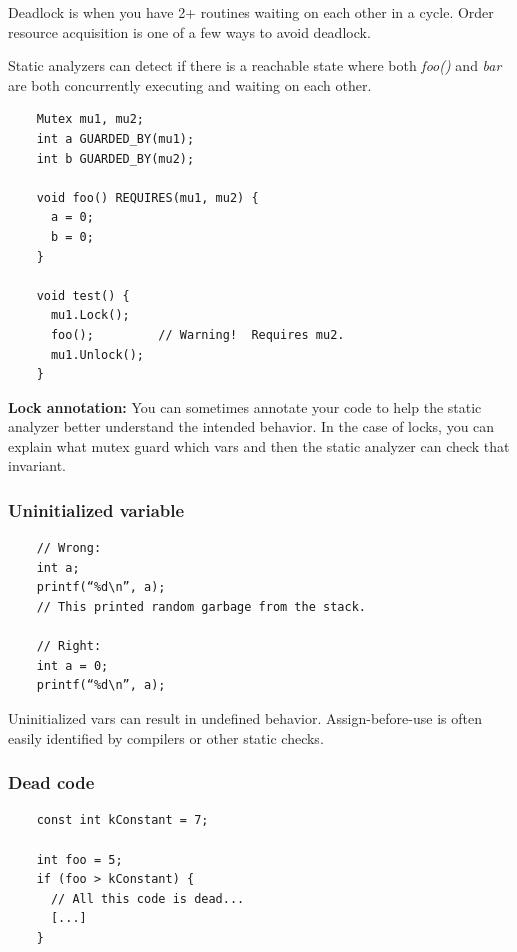 \documentclass{article}
\begin{document}
Deadlock is when you have 2+ routines waiting on each other in a cycle. Order resource acquisition is one of a few ways to avoid deadlock. 

\vspace*{1em}

Static analyzers can detect if there is a reachable state where both \textit{foo()} and \textit{bar} are both concurrently executing and waiting on each other.

\hrulefill

\begin{verbatim}
    Mutex mu1, mu2;
    int a GUARDED_BY(mu1);
    int b GUARDED_BY(mu2);
    
    void foo() REQUIRES(mu1, mu2) {
      a = 0;
      b = 0;
    }
    
    void test() {
      mu1.Lock();
      foo();         // Warning!  Requires mu2.
      mu1.Unlock();
    }    
\end{verbatim}

\textbf{Lock annotation:} You can sometimes annotate your code to help the static analyzer better understand the intended behavior. In the case of locks, you can explain what mutex guard which vars and then the static analyzer can check that invariant.

\subsubsection{Uninitialized variable}

\begin{verbatim}
    // Wrong:
    int a;
    printf(“%d\n”, a);
    // This printed random garbage from the stack.

    // Right:
    int a = 0;
    printf(“%d\n”, a);
\end{verbatim}

Uninitialized vars can result in undefined behavior. Assign-before-use is often easily identified by compilers or other static checks.

\subsubsection{Dead code}

\begin{verbatim}
    const int kConstant = 7;

    int foo = 5;
    if (foo > kConstant) {
      // All this code is dead...
      [...]
    }
    
\end{verbatim}
\end{document}
